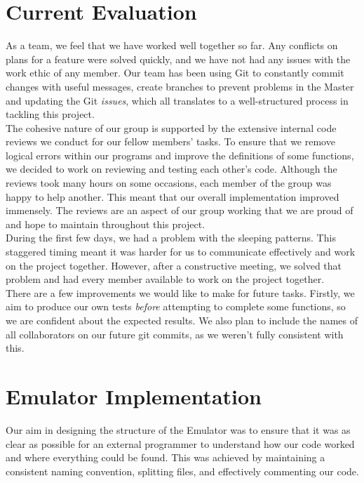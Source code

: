 \documentclass[10pt]{article}
\begin{document}
\section*{Current Evaluation}
As a team, we feel that we have worked well together so far. Any conflicts on plans for a feature were solved quickly, and we have not had any issues with the work ethic of any member. Our team has been using Git to constantly commit changes with useful messages, create branches to prevent problems in the Master and updating the Git \textsl{issues}, which all translates to a well-structured process in tackling this project.
\\

The cohesive nature of our group is supported by the extensive internal code reviews we conduct for our fellow members’ tasks. To ensure that we remove logical errors within our programs and improve the definitions of some functions, we decided to work on reviewing and testing each other’s code. Although the reviews took many hours on some occasions, each member of the group was happy to help another. This meant that our overall implementation improved immensely. The reviews are an aspect of our group working that we are proud of and hope to maintain throughout this project.
\\

During the first few days, we had a problem with the sleeping patterns. This staggered timing meant it was harder for us to communicate effectively and work on the project together. However, after a constructive meeting, we solved that problem and had every member available to work on the project together.
\\

There are a few improvements we would like to make for future tasks. Firstly, we aim to produce our own tests \textsl{before} attempting to complete some functions, so we are confident about the expected results. We also plan to include the names of all collaborators on our future git commits, as we weren't fully consistent with this.  

\section*{Emulator Implementation}
Our aim in designing the structure of the Emulator was to ensure that it was as clear as possible for an external programmer to understand how our code worked and where everything could be found. This was achieved by maintaining a consistent naming convention, splitting files, and effectively commenting our code.
\end{document}
